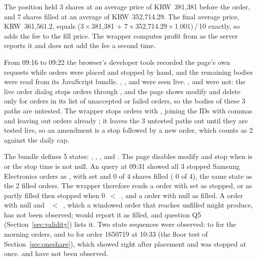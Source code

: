 

 The position held 3 shares at an average price of KRW~381,381 before the order, and 7 shares filled at an average of KRW~352,714.29. The final average price, KRW~361,561.2, equals (3\,×\,381,381 + 7\,×\,352,714.29\,×\,1.001)\,/\,10 exactly, so  adds the fee to the fill price. The wrapper computes profit from  as the server reports it and does not add the fee a second time.

 From 09:16 to 09:22 the browser's developer tools recorded the page's own requests while orders were placed and stopped by hand, and the remaining bodies were read from its JavaScript bundle. , ,  and  were seen live. ,  and  were not: the live order dialog stops orders through , and the page shows modify and delete only for orders in its list of unaccepted or failed orders, so the bodies of these 3 paths are untested. The wrapper stops orders with , joining the IDs with commas and leaving out orders already ; it leaves the 3 untested paths out until they are tested live, so an amendment is a stop followed by a new order, which counts as 2 against the daily cap.



 The bundle defines 5 states: , , ,  and . The page disables modify and stop when  is  or the stop time  is not null. An  query at 09:31 showed all 3 stopped Samsung Electronics orders as , with  set and 0 of 4 shares filled ( 0 of  4), the same state as the 2 filled orders. The wrapper therefore reads a  order with  set as stopped, or as partly filled then stopped when 0~$<$~, and a  order with  null as filled. A  order with  null and ~$<$~, which a windowed order that reaches  unfilled might produce, has not been observed;  would report it as filled, and question Q5 (Section~\ref{sec:validity}) lists it. Two state sequences were observed:  to  for the morning orders, and  to  for order 1650719 at 10:33 (the floor test of Section~\ref{sec:oneshare}), which showed  right after placement and was stopped at once.  and  have not been observed.

